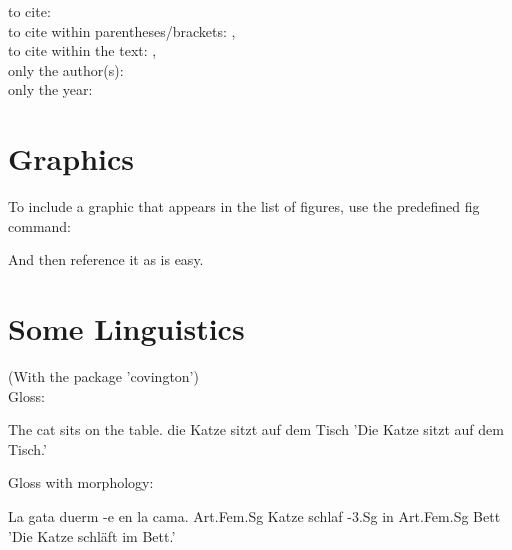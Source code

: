 to cite: \cite[30-31]{Koehn2005} \\
to cite within parentheses/brackets: \citep{Koehn2005}, \citep[30-32]{Koehn2005}\\ %

to cite within the text: \citet{Koehn2005}, \citet[37]{Koehn2005}\\
only the author(s): \citeauthor{Callison-Burch2006}\\
only the year: \citeyear{Callison-Burch2006}\\

\section{Graphics}

To include a graphic that appears in the list of figures, use the predefined fig command:\\

And then reference it as  is easy.

\section{Some Linguistics}

(With the package 'covington')\\

Gloss:

\begin{examples}
 \item \gll The cat sits on the table.
	    die Katze sitzt auf dem Tisch
	\glt 'Die Katze sitzt auf dem Tisch.'
    \glend
\end{examples}

Gloss with morphology:

\begin{examples}
 \item \gll La gata duerm -e en la cama.
	    Art.Fem.Sg Katze schlaf -3.Sg in Art.Fem.Sg Bett
	\glt 'Die Katze schl\"aft im Bett.'
    \glend
\end{examples}

